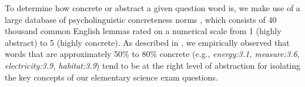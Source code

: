 To determine how concrete or abstract a given question word is, we make use of a large database of psycholinguistic concreteness norms \citep{brysbaert:2014}, which consists of 40 thousand common English lemmas rated on a numerical scale from 1 (highly abstract) to 5 (highly concrete).  As described in \citet{jansen2017framing}, we empirically observed that words that are approximately 50\% to 80\% concrete (e.g., \emph{energy:3.1, measure:3.6, electricity:3.9, habitat:3.9}) tend to be at the right level of abstraction for isolating the key concepts of our elementary science exam questions.



